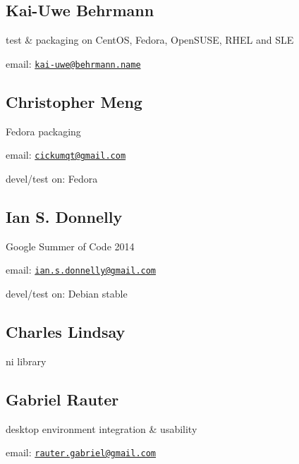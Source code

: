 \subsection*{Kai-\/\+Uwe Behrmann}

test \& packaging on Cent\+OS, Fedora, Open\+S\+U\+SE, R\+H\+EL and S\+LE


\begin{DoxyItemize}
\item email\+: \href{mailto:kai-uwe@behrmann.name}{\tt kai-\/uwe@behrmann.\+name}
\end{DoxyItemize}

\subsection*{Christopher Meng}

Fedora packaging


\begin{DoxyItemize}
\item email\+: \href{mailto:cickumqt@gmail.com}{\tt cickumqt@gmail.\+com}
\item devel/test on\+: Fedora
\end{DoxyItemize}

\subsection*{Ian S. Donnelly}

Google Summer of Code 2014


\begin{DoxyItemize}
\item email\+: \href{mailto:ian.s.donnelly@gmail.com}{\tt ian.\+s.\+donnelly@gmail.\+com}
\item devel/test on\+: Debian stable
\end{DoxyItemize}

\subsection*{Charles Lindsay}

ni library

\subsection*{Gabriel Rauter}

desktop environment integration \& usability


\begin{DoxyItemize}
\item email\+: \href{mailto:rauter.gabriel@gmail.com}{\tt rauter.\+gabriel@gmail.\+com}
\end{DoxyItemize}

